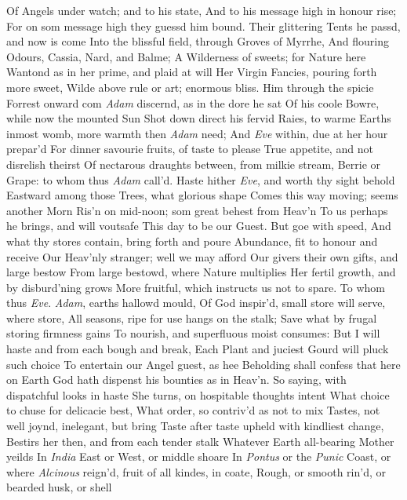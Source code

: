 \documentclass[11pt]{book}
\begin{document}
Of Angels under watch; and to his state, 
And to his message high in honour rise; 
For on som message high they guessd him bound. 
Their glittering Tents he passd, and now is come 
Into the blissful field, through Groves of Myrrhe, 
And flouring Odours, Cassia, Nard, and Balme; 
A Wilderness of sweets; for Nature here 
Wantond as in her prime, and plaid at will 
Her Virgin Fancies, pouring forth more sweet, 
Wilde above rule or art; enormous bliss. 
Him through the spicie Forrest onward com 
\textit{Adam} discernd, as in the dore he sat 
Of his coole Bowre, while now the mounted Sun 
Shot down direct his fervid Raies, to warme 
Earths inmost womb, more warmth then \textit{Adam} need; 
And \textit{Eve} within, due at her hour prepar'd 
For dinner savourie fruits, of taste to please 
True appetite, and not disrelish theirst 
Of nectarous draughts between, from milkie stream, 
Berrie or Grape: to whom thus \textit{Adam} call'd. 
\quad Haste hither \textit{Eve}, and worth thy sight behold 
Eastward among those Trees, what glorious shape 
Comes this way moving; seems another Morn 
Ris'n on mid-noon; som great behest from Heav'n 
To us perhaps he brings, and will voutsafe 
This day to be our Guest.  But goe with speed, 
And what thy stores contain, bring forth and poure 
Abundance, fit to honour and receive 
Our Heav'nly stranger; well we may afford 
Our givers their own gifts, and large bestow 
From large bestowd, where Nature multiplies 
Her fertil growth, and by disburd'ning grows 
More fruitful, which instructs us not to spare. 
\quad To whom thus \textit{Eve}. \textit{Adam}, earths hallowd mould, 
Of God inspir'd, small store will serve, where store, 
All seasons, ripe for use hangs on the stalk; 
Save what by frugal storing firmness gains 
To nourish, and superfluous moist consumes: 
But I will haste and from each bough and break, 
Each Plant and juciest Gourd will pluck such choice 
To entertain our Angel guest, as hee 
Beholding shall confess that here on Earth 
God hath dispenst his bounties as in Heav'n. 
\quad So saying, with dispatchful looks in haste 
She turns, on hospitable thoughts intent 
What choice to chuse for delicacie best, 
What order, so contriv'd as not to mix 
Tastes, not well joynd, inelegant, but bring 
Taste after taste upheld with kindliest change, 
Bestirs her then, and from each tender stalk 
Whatever Earth all-bearing Mother yeilds 
In \textit{India} East or West, or middle shoare 
In \textit{Pontus} or the \textit{Punic} Coast, or where 
\textit{Alcinous} reign'd, fruit of all kindes, in coate, 
Rough, or smooth rin'd, or bearded husk, or shell 
\end{document}
